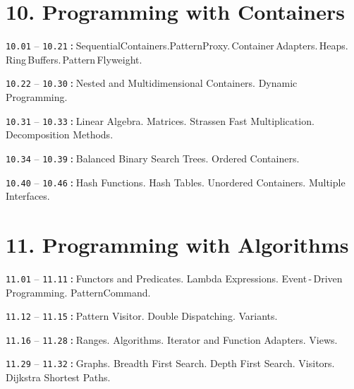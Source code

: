 \documentclass[a4paper,12pt]{article}
\renewenvironment{itemize}
{
    \begin{list}{\labelitemi}
    {
      \setlength{\topsep}{0pt}
      \setlength{\partopsep}{0pt}
      \setlength{\parskip}{0pt}
      \setlength{\itemsep}{0pt}
      \setlength{\parsep}{0pt}
      \setlength{\leftmargin}{14.5pt}
    }
}{\end{list}}
\begin{document}
\section{10. Programming with Containers}

\begin{itemize}

    \item \texttt{10.01} -- \texttt{10.21}\,\texttt{:}\,Sequential\:Containers.\:Pattern\:Proxy.\,Container\,Adapters.\,Heaps.\,Ring\,Buffers.\,Pattern\,Flyweight.

    \smallskip

    \item \texttt{10.22} -- \texttt{10.30}\,\texttt{:}\,Nested and Multidimensional Containers. Dynamic Programming.

    \smallskip

    \item \texttt{10.31} -- \texttt{10.33}\,\texttt{:}\,Linear Algebra. Matrices. Strassen Fast Multiplication. Decomposition Methods.

    \smallskip

    \item \texttt{10.34} -- \texttt{10.39}\,\texttt{:}\,Balanced Binary Search Trees. Ordered Containers.

    \smallskip

    \item \texttt{10.40} -- \texttt{10.46}\,\texttt{:}\,Hash Functions. Hash Tables. Unordered Containers. Multiple Interfaces.
    
\end{itemize}

\section{11. Programming with Algorithms}

\begin{itemize}

    \item \texttt{11.01} -- \texttt{11.11}\,\texttt{:}\,Functors and Predicates. Lambda Expressions. Event\,-\,Driven Programming. Pattern\:Command.

    \smallskip

    \item \texttt{11.12} -- \texttt{11.15}\,\texttt{:}\,Pattern Visitor. Double Dispatching. Variants.

    \smallskip

    \item \texttt{11.16} -- \texttt{11.28}\,\texttt{:}\,Ranges. Algorithms. Iterator and Function Adapters. Views.

    \smallskip

    \item \texttt{11.29} -- \texttt{11.32}\,\texttt{:}\,Graphs. Breadth First Search. Depth First Search. Visitors. Dijkstra Shortest Paths.
    
\end{itemize}
\end{document}
